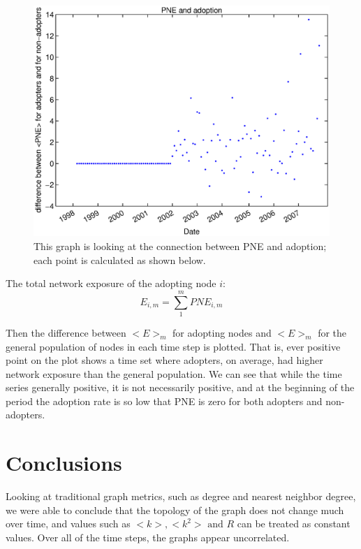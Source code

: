 \documentclass[12pt]{article}
\begin{document}
\begin{figure}[H]
\includegraphics[width = \textwidth]{Graficos/PNEandAdoption.eps}
\caption{This graph is looking at the connection between PNE and adoption; each point is calculated as shown below.}
\label{fig:PNEandAdoption}
\end{figure}

The total network exposure of the adopting node \(i\):
\begin{equation}
E_{i,m} = \sum_1^m PNE_{i,m}
\label{eq:PNEandAdopt}
\end{equation}

Then the difference between \(<E>_m\) for adopting nodes and \(<E>_m\) for the general population of nodes in each time step is plotted. That is, ever positive point on the plot shows a time set where adopters, on average, had higher network exposure than the general population. We can see that while the time series generally positive, it is not necessarily positive, and at the beginning of the period the adoption rate is so low that PNE is zero for both adopters and non-adopters.

\section{Conclusions}
Looking at traditional graph metrics, such as degree and nearest neighbor degree, we were able to conclude that the topology of the graph does not change much over time, and values such as \(<k>, <k^2> \text{ and } R\) can be treated as constant values. Over all of the time steps, the graphs appear uncorrelated.
\end{document}
